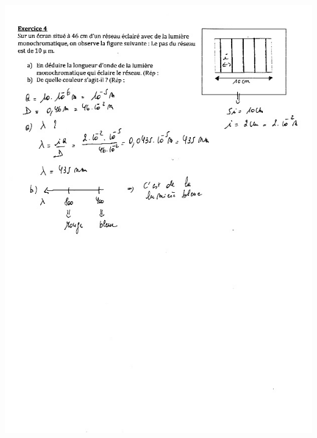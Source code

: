 \includegraphics[width=18.503cm,height=25.788cm]{Pictures/100000010000026700000359459F0C15512CA66D.png}
